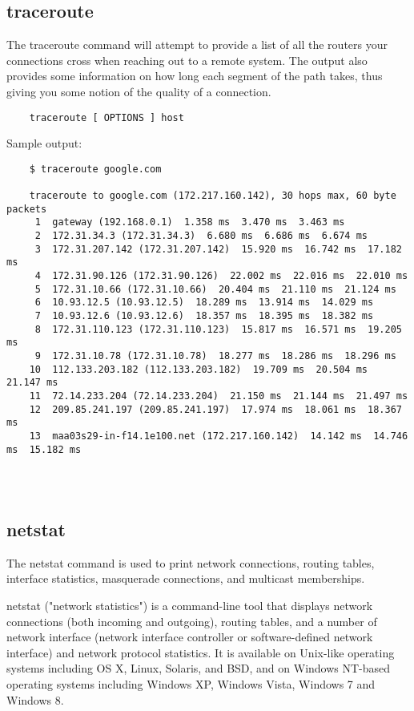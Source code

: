 \documentclass[a4paper,12pt]{article}
\begin{document}
    \subsection{traceroute}
    The traceroute command will attempt to provide a list of all the routers your connections cross when reaching out to a remote system. The output also provides some information on how long each segment of the path takes, thus giving you some notion of the quality of a connection.
    
    \begin{verbatim}
    traceroute [ OPTIONS ] host
    \end{verbatim}
    
    Sample output:
    \begin{verbatim}
    $ traceroute google.com
    
    traceroute to google.com (172.217.160.142), 30 hops max, 60 byte packets
     1  gateway (192.168.0.1)  1.358 ms  3.470 ms  3.463 ms
     2  172.31.34.3 (172.31.34.3)  6.680 ms  6.686 ms  6.674 ms
     3  172.31.207.142 (172.31.207.142)  15.920 ms  16.742 ms  17.182 ms
     4  172.31.90.126 (172.31.90.126)  22.002 ms  22.016 ms  22.010 ms
     5  172.31.10.66 (172.31.10.66)  20.404 ms  21.110 ms  21.124 ms
     6  10.93.12.5 (10.93.12.5)  18.289 ms  13.914 ms  14.029 ms
     7  10.93.12.6 (10.93.12.6)  18.357 ms  18.395 ms  18.382 ms
     8  172.31.110.123 (172.31.110.123)  15.817 ms  16.571 ms  19.205 ms
     9  172.31.10.78 (172.31.10.78)  18.277 ms  18.286 ms  18.296 ms
    10  112.133.203.182 (112.133.203.182)  19.709 ms  20.504 ms  21.147 ms
    11  72.14.233.204 (72.14.233.204)  21.150 ms  21.144 ms  21.497 ms
    12  209.85.241.197 (209.85.241.197)  17.974 ms  18.061 ms  18.367 ms
    13  maa03s29-in-f14.1e100.net (172.217.160.142)  14.142 ms  14.746 ms  15.182 ms
    
    \end{verbatim}
    \begin{verbatim}
    
    \end{verbatim}
    
    \subsection{netstat}
    
    The netstat command is used to print network connections, routing tables, interface statistics, masquerade connections, and multicast memberships.
    
    netstat ("network statistics") is a command-line tool that displays network connections (both incoming and outgoing), routing tables, and a number of network interface (network interface controller or software-defined network interface) and network protocol statistics. It is available on Unix-like operating systems including OS X, Linux, Solaris, and BSD, and on Windows NT-based operating systems including Windows XP, Windows Vista, Windows 7 and Windows 8.
    
\end{document}
